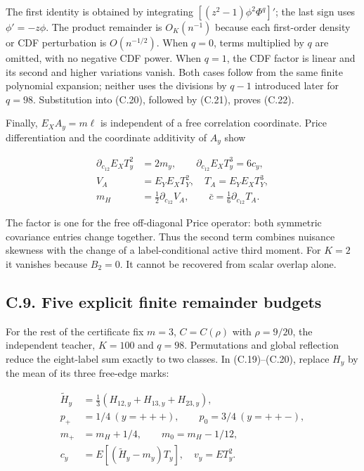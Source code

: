 \documentclass{article}
\begin{document}
The first identity is obtained by integrating
\([(z^2-1)\phi^2\Phi^q]'\); the last sign uses \(\phi'=-z\phi\). The
product remainder is \(O_K(n^{-1})\) because each first-order density or
CDF perturbation is \(O(n^{-1/2})\). When \(q=0\), terms multiplied by
\(q\) are omitted, with no negative CDF power. When \(q=1\), the CDF
factor is linear and its second and higher variations vanish. Both cases
follow from the same finite polynomial expansion; neither uses the
divisions by \(q-1\) introduced later for \(q=98\). Substitution into
(C.20), followed by (C.21), proves (C.22).

Finally, \(E_XA_y=m\ell\) is independent of a free correlation
coordinate. Price differentiation and the coordinate additivity of
\(A_y\) show

\[
\begin{aligned}
\partial_{c_{12}}E_XT_y^2&=2m_y,\qquad
\partial_{c_{12}}E_XT_y^3=6c_y,\\
V_A&=E_YE_XT_Y^2,\quad T_A=E_YE_XT_Y^3,\\
m_H&=\tfrac12\partial_{c_{12}}V_A,\qquad
\bar c=\tfrac16\partial_{c_{12}}T_A.
\end{aligned}
\tag{C.27}
\]

The factor is one for the free off-diagonal Price operator: both
symmetric covariance entries change together. Thus the second term
combines nuisance skewness with the change of a label-conditional active
third moment. For \(K=2\) it vanishes because \(B_2=0\). It cannot be
recovered from scalar overlap alone.

\subsection*{C.9. Five explicit finite remainder
budgets}\label{c.9.-five-explicit-finite-remainder-budgets}

For the rest of the certificate fix \(m=3\), \(C=C(\rho)\) with
\(\rho=9/20\), the independent teacher, \(K=100\) and \(q=98\).
Permutations and global reflection reduce the eight-label sum exactly to
two classes. In (C.19)--(C.20), replace \(H_y\) by the mean of its three
free-edge marks:

\[
\begin{aligned}
\widetilde H_y&=\tfrac13(H_{12,y}+H_{13,y}+H_{23,y}),\\
p_+&=1/4\ (y=+++),\qquad p_0=3/4\ (y=++-),\\
m_+&=m_H+1/4,\qquad m_0=m_H-1/12,\\
c_y&=E[(\widetilde H_y-m_y)T_y],\quad v_y=ET_y^2.
\end{aligned}
\tag{C.28}
\]
\end{document}
